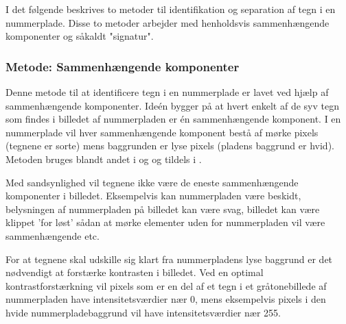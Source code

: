 


I det følgende beskrives to metoder til identifikation og separation af tegn i en nummerplade. Disse to metoder arbejder med henholdsvis sammenhængende komponenter og såkaldt "signatur".

\subsubsection*{Metode: Sammenhængende komponenter}
Denne metode til at identificere tegn i en nummerplade er lavet ved hjælp af sammenhængende komponenter. Ideén bygger på at hvert enkelt af de syv tegn som findes i billedet af nummerpladen er én sammenhængende komponent. I en nummerplade vil hver sammenhængende komponent bestå af mørke pixels (tegnene er sorte) mens baggrunden er lyse pixels (pladens baggrund er hvid). Metoden bruges blandt andet i \cite{nijhuis} og \cite{parker} og tildels i \cite{kwas}.

Med sandsynlighed vil tegnene ikke være de eneste sammenhængende komponenter i billedet. Eksempelvis kan nummerpladen være beskidt, belysningen af nummerpladen på billedet kan være svag, billedet kan være klippet 'for løst' sådan at mørke elementer uden for nummerpladen vil være sammenhængende etc.

For at tegnene skal udskille sig klart fra nummerpladens lyse baggrund er det nødvendigt at forstærke kontrasten i billedet. Ved en optimal kontrastforstærkning vil pixels som er en del af et tegn i et gråtonebillede af nummerpladen have intensitetsværdier nær 0, mens eksempelvis pixels i den hvide nummerpladebaggrund vil have intensitetsværdier nær 255.



